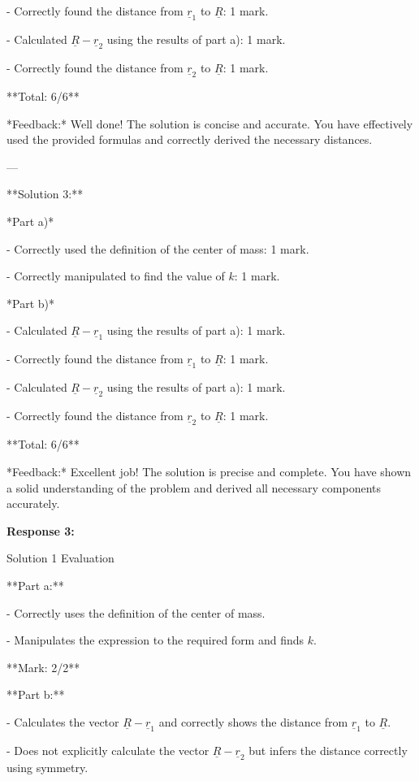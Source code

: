 \documentclass[a4paper,11pt]{article}
\begin{document}
- Correctly found the distance from \(\underline{r}_1\) to \(\underline{R}\): 1 mark.

- Calculated \(\underline{R} - \underline{r}_2\) using the results of part a): 1 mark.

- Correctly found the distance from \(\underline{r}_2\) to \(\underline{R}\): 1 mark.

**Total: 6/6**

*Feedback:* Well done! The solution is concise and accurate. You have effectively used the provided formulas and correctly derived the necessary distances.

---

**Solution 3:**

*Part a)*

- Correctly used the definition of the center of mass: 1 mark.

- Correctly manipulated to find the value of \( k \): 1 mark.

*Part b)*

- Calculated \(\underline{R} - \underline{r}_1\) using the results of part a): 1 mark.

- Correctly found the distance from \(\underline{r}_1\) to \(\underline{R}\): 1 mark.

- Calculated \(\underline{R} - \underline{r}_2\) using the results of part a): 1 mark.

- Correctly found the distance from \(\underline{r}_2\) to \(\underline{R}\): 1 mark.

**Total: 6/6**

*Feedback:* Excellent job! The solution is precise and complete. You have shown a solid understanding of the problem and derived all necessary components accurately.

\bigskip
\textbf{Response 3:}

Solution 1 Evaluation

**Part a:**

- Correctly uses the definition of the center of mass.

- Manipulates the expression to the required form and finds \( k \).

**Mark: 2/2**

**Part b:**

- Calculates the vector \( \underline{R} - \underline{r}_1 \) and correctly shows the distance from \( \underline{r}_1 \) to \( \underline{R} \).

- Does not explicitly calculate the vector \( \underline{R} - \underline{r}_2 \) but infers the distance correctly using symmetry.
\end{document}
